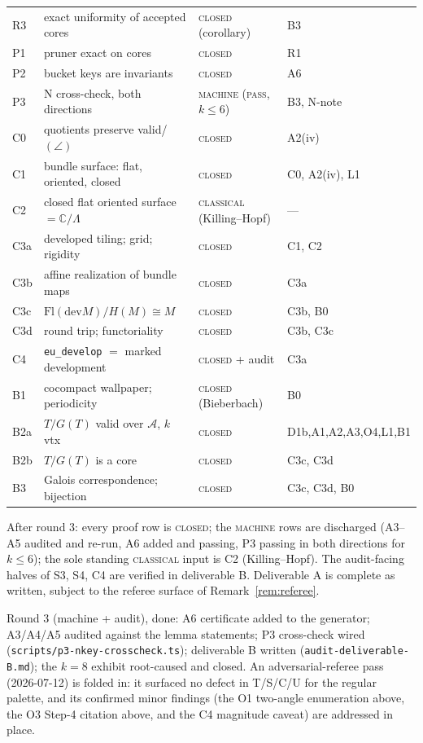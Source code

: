 \documentclass[11pt]{article}
\theoremstyle{definition}
\newcommand{\Flags}{\mathrm{Fl}}
\newcommand{\dev}{\mathrm{dev}}
\newcommand{\A}{\mathcal{A}}
\newcommand{\C}{\mathbb{C}}
\begin{document}
\begin{center}
\begin{tabular}{llll}
R3 & exact uniformity of accepted cores & \textsc{closed} (corollary) & B3 \\
P1 & pruner exact on cores & \textsc{closed} & R1 \\
P2 & bucket keys are invariants & \textsc{closed} & A6 \\
P3 & N cross-check, both directions & \textsc{machine} (\textsc{pass}, $k \le 6$) & B3, N-note \\
C0 & quotients preserve valid/$(\angle)$ & \textsc{closed} & A2(iv) \\
C1 & bundle surface: flat, oriented, closed & \textsc{closed} & C0, A2(iv), L1 \\
C2 & closed flat oriented surface $= \C/\Lambda$ & \textsc{classical} (Killing--Hopf) & --- \\
C3a & developed tiling; grid; rigidity & \textsc{closed} & C1, C2 \\
C3b & affine realization of bundle maps & \textsc{closed} & C3a \\
C3c & $\Flags(\dev M)/H(M) \cong M$ & \textsc{closed} & C3b, B0 \\
C3d & round trip; functoriality & \textsc{closed} & C3b, C3c \\
C4 & \texttt{eu\_develop} $=$ marked development & \textsc{closed} + audit & C3a \\
B1 & cocompact wallpaper; periodicity & \textsc{closed} (Bieberbach) & B0 \\
B2a & $T/G(T)$ valid over $\A$, $k$ vtx & \textsc{closed} & D1b,A1,A2,A3,O4,L1,B1 \\
B2b & $T/G(T)$ is a core & \textsc{closed} & C3c, C3d \\
B3 & Galois correspondence; bijection & \textsc{closed} & C3c, C3d, B0 \\
\end{tabular}
\end{center}
\endgroup

After round 3: every proof row is \textsc{closed}; the \textsc{machine} rows are
discharged (A3--A5 audited and re-run, A6 added and passing, P3 passing in both
directions for $k \le 6$); the sole standing \textsc{classical} input is C2
(Killing--Hopf). The audit-facing halves of S3, S4, C4 are verified in deliverable B.
Deliverable A is complete as written, subject to the referee surface of
Remark~\ref{rem:referee}.

Round 3 (machine + audit), done: A6 certificate added to the generator; A3/A4/A5
audited against the lemma statements; P3 cross-check wired
(\texttt{scripts/p3-nkey-crosscheck.ts}); deliverable B written
(\texttt{audit-deliverable-B.md}); the $k{=}8$ exhibit root-caused and closed. An
adversarial-referee pass (2026-07-12) is folded in: it surfaced no defect in T/S/C/U for
the regular palette, and its confirmed minor findings (the O1 two-angle enumeration
above, the O3 Step-4 citation above, and the C4 magnitude caveat) are addressed in place.
\end{document}

